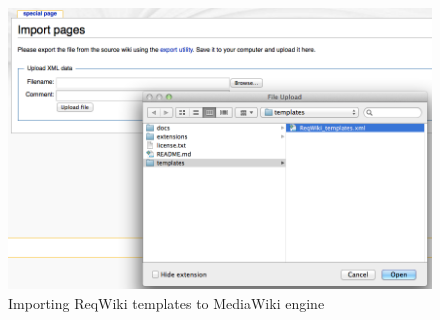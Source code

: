 \documentclass[10pt,twoside,openany,bibtotoc,liststotoc]{scrbook}
\begin{document}
\begin{figure}[h!]
\centering
\includegraphics[width=\textwidth]{reqwiki_template_import.png}
\caption{Importing ReqWiki templates to MediaWiki engine}
\label{fig:wiki_template_import}
\end{figure}

\backmatter


\end{document}
